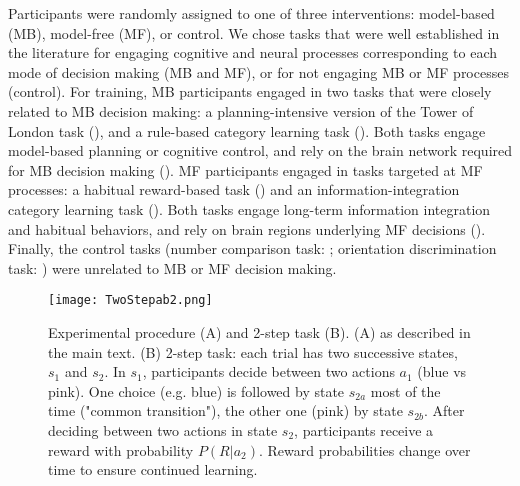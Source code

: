 \documentclass[11pt]{article} %
\begin{document}
Participants were randomly assigned to one of three interventions: model-based (MB), model-free (MF), or control. We chose tasks that were well established in the literature for engaging cognitive and neural processes corresponding to each mode of decision making (MB and MF), or for not engaging MB or MF processes (control). For training, MB participants engaged in two tasks that were closely related to MB decision making: a planning-intensive version of the Tower of London task (\cite{beauchamp_dynamic_2003}), and a rule-based category learning task (\cite{maddox_dissociating_2004}). Both tasks engage model-based planning or cognitive control, and rely on the brain network required for MB decision making (\cite{dolan_goals_2013}). MF participants engaged in tasks targeted at MF processes: a habitual reward-based task (\cite{tricomi_value_2015}) and an information-integration category learning task (\cite{maddox_dissociating_2004}). Both tasks engage long-term information integration and habitual behaviors, and rely on brain regions underlying MF decisions (\cite{dolan_goals_2013}). Finally, the control tasks (number comparison task: \cite{piazza_neurocognitive_2010}; orientation discrimination task: \cite{sasaki_advances_2010}) were unrelated to MB or MF decision making. 
%
\begin{figure}
	\texttt{[image: TwoStepab2.png]}
	\caption{Experimental procedure (A) and 2-step task (B). (A) as described in the main text. (B) 2-step task: each trial has two successive states, $s_{1}$ and $s_{2}$. In $s_{1}$, participants decide between two actions $a_{1}$ (blue vs pink). One choice (e.g. blue) is followed by state $s_{2a}$ most of the time ("common transition"), the other one (pink) by state $s_{2b}$. After deciding between two actions in state $s_{2}$, participants receive a reward with probability $P(R|a_{2})$. Reward probabilities change over time to ensure continued learning.}
	\label{TwoStep}
\end{figure}
%
\end{document}

